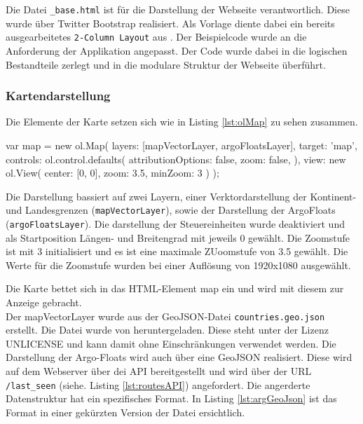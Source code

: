 Die Datei \texttt{\_base.html} ist für die Darstellung der Webseite verantwortlich. Diese wurde über Twitter Bootstrap realisiert. Als Vorlage diente dabei ein bereits ausgearbeitetes  \texttt{2-Column Layout} aus \cite{Ng2014}. Der Beispielcode wurde an die Anforderung der Applikation angepasst. Der Code wurde dabei in die logischen Bestandteile zerlegt und in die modulare Struktur der Webseite überführt.

\subsubsection{Kartendarstellung}


Die Elemente der Karte setzen sich wie in Listing \ref{lst:olMap} zu sehen zusammen.

\begin{javascript}[label={lst:olMAP}, caption={Das ol.Map Element aus der Kartendarstellung}]
 var map = new ol.Map({
    layers: [mapVectorLayer, argoFloatsLayer],
    target: 'map',
    controls: ol.control.defaults({
        attributionOptions: false,
        zoom: false,
    }),
    view: new ol.View({
        center: [0, 0],
        zoom: 3.5,
        minZoom: 3
    })
});
\end{javascript}

Die Darstellung bassiert auf zwei Layern, einer Verktordarstellung der Kontinent- und Landesgrenzen (\texttt{mapVectorLayer}), sowie der Darstellung der ArgoFloats (\texttt{argoFloatsLayer}). Die darstellung der Steuereinheiten wurde deaktiviert und als Startposition Längen- und Breitengrad mit jeweils 0 gewählt. Die Zoomstufe ist mit 3 initialisiert und es ist eine maximale ZUoomstufe von 3.5 gewählt. Die Werte für die Zoomstufe wurden bei einer Auflösung von 1920x1080 ausgewählt.

Die Karte bettet sich in das HTML-Element map ein und wird mit diesem zur Anzeige gebracht.
\\
Der mapVectorLayer wurde aus der GeoJSON-Datei \texttt{countries.geo.json}  erstellt. Die Datei wurde von \cite{sundstrm16} heruntergeladen. Diese steht unter der Lizenz UNLICENSE und kann damit ohne Einschränkungen verwendet werden. Die Darstellung der Argo-Floats wird auch über eine GeoJSON realisiert. Diese wird auf dem Webserver über dei API bereitgestellt und wird über der URL \texttt{/last\_seen} (siehe. Listing \ref{lst:routesAPI}) angefordert. Die angerderte Datenstruktur hat ein spezifisches Format. In Listing \ref{lst:argGeoJson} ist das Format in einer gekürzten Version der Datei ersichtlich. 

